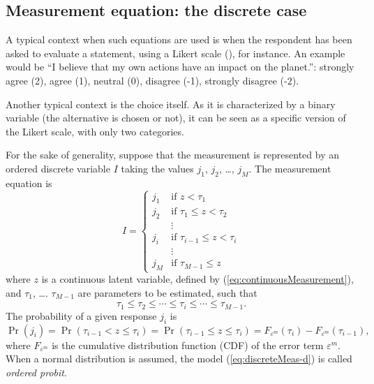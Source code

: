 \documentclass[12pt,a4paper]{article}
\newcommand{\req}[1]{(\ref{#1})}
\newcommand{\prob}{\operatorname{Pr}}
\begin{document}
\subsection{Measurement equation: the discrete case}

A typical context when such equations are used is when the respondent
has been asked to evaluate a statement, using a Likert scale
(\cite{likert1932technique}), for instance.
An example would be  ``I believe that my own actions have an impact on
the planet.'': strongly agree (2), agree (1), neutral (0), disagree
(-1), strongly disagree (-2). 

Another typical context is the choice itself. As it is characterized
by a binary
variable (the alternative is chosen or not), it can be seen as a
specific version of the Likert scale, with only two categories.

For the sake of generality, suppose that the measurement is represented by an ordered discrete variable $I$
taking the values $j_1$, $j_2$, \ldots , $j_M$. The measurement
equation is 
\begin{equation}
\label{eq:discreteMeas-b}
I = \left\{
\begin{array}{ll}
j_1 & \text{if } z < \tau_1 \\
j_2 & \text{if } \tau_1 \leq z < \tau_2 \\
& \vdots \\
j_i & \text{if } \tau_{i-1} \leq z < \tau_i \\
& \vdots \\
j_M & \text{if } \tau_{M-1} \leq z
\end{array}
\right.
\end{equation}
where $z$ is a continuous latent variable, defined by \req{eq:continuousMeasurement}, and $\tau_1$, \ldots. $\tau_{M-1}$ are parameters to be estimated,
such that
\begin{equation}
\label{eq:discreteMeas-c}
\tau_1 \leq \tau_2 \leq \cdots \leq \tau_i \leq \cdots \leq \tau_{M-1}. 
\end{equation}
The probability of a given response $j_i$ is
\begin{equation}
\label{eq:discreteMeas-d}
\prob(j_i) = \prob(\tau_{i-1} < z \leq \tau_i) =  \prob(\tau_{i-1} \leq z \leq \tau_i) =
F_{\varepsilon^m}(\tau_i) - F_{\varepsilon^m}(\tau_{i-1}),
\end{equation}
where $F_{\varepsilon^m}$ is the cumulative distribution function
(CDF) of the error term $\varepsilon^m$. When a normal
distribution is assumed, the model \req{eq:discreteMeas-d} is called \emph{ordered probit}. 
\end{document}
